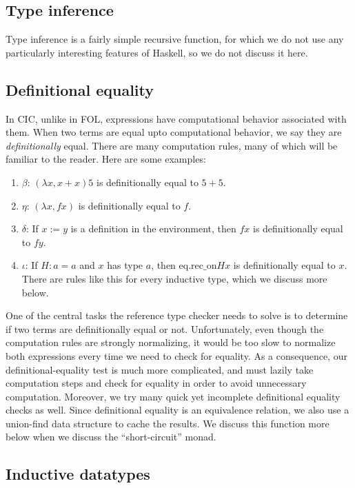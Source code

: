 \documentclass{article}
\begin{document}
\begin{spacing}{1.1}
\subsection{Type inference}

Type inference is a fairly simple recursive function, for which we do not use any particularly interesting features of Haskell, so we do not discuss it here.

\subsection{Definitional equality}

In CIC, unlike in FOL, expressions have computational behavior associated with them. When two terms are equal upto computational behavior, we say they are \emph{definitionally} equal. There are many computation rules, many of which will be familiar to the reader. Here are some examples:
\begin{enumerate}
\item \( \beta \): \( (\lambda x, x + x) 5 \) is definitionally equal to \( 5 + 5 \).
\item \( \eta \): \( (\lambda x, f x) \) is definitionally equal to \( f \).
\item \( \delta \): If \( x := y \) is a definition in the environment, then \( f x \) is definitionally equal to \( f y \).
\item \( \iota \): If \( H : a = a \) and \( x \) has type \( a \), then \( \mathrm{eq.rec\_on} H x \) is definitionally equal to \( x \). There are rules like this for every inductive type, which we discuss more below.
\end{enumerate}

One of the central tasks the reference type checker needs to solve is to determine if two terms are definitionally equal or not. Unfortunately, even though the computation rules are strongly normalizing, it would be too slow to normalize both expressions every time we need to check for equality. As a consequence, our definitional-equality test is much more complicated, and must lazily take computation steps and check for equality in order to avoid unnecessary computation. Moreover, we try many quick yet incomplete definitional equality checks as well. Since definitional equality is an equivalence relation, we also use a union-find data structure to cache the results. We discuss this function more below when we discuss the ``short-circuit'' monad.

\subsection{Inductive datatypes}


\end{spacing}
\end{document}
